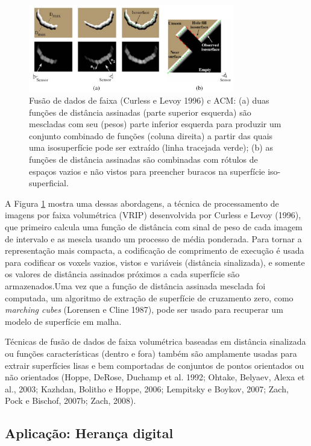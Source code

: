 \documentclass{article}
\begin{document}
\begin{figure}[!htb]
    \centering
    \includegraphics[width=0.8\textwidth]{fusaoDeDadosDeIntervalo.png}
    \caption{Fusão de dados de faixa (Curless e Levoy 1996) c ACM: (a) duas funções de distância assinadas (parte superior esquerda) são mescladas com seu (pesos) parte inferior esquerda para produzir um conjunto combinado de funções (coluna direita) a partir das quais uma isosuperfície pode ser extraído (linha tracejada verde); (b) as funções de distância assinadas são combinadas com rótulos de espaços vazios e não vistos para preencher buracos na superfície iso-superficial.}
    \label{fig:fusaoDeDadosDeIntervalo}
\end{figure}

A Figura \ref{fig:fusaoDeDadosDeIntervalo} mostra uma dessas abordagens, a técnica de processamento de imagens por faixa volumétrica (VRIP) desenvolvida por Curless e Levoy (1996), que primeiro calcula uma função de distância com sinal de peso de cada imagem de intervalo e as mescla usando um processo de média ponderada. Para tornar a representação mais compacta, a codificação de comprimento de execução é usada para codificar os voxels vazios, vistos e variáveis (distância sinalizada), e somente os valores de distância assinados próximos a cada superfície são armazenados.Uma vez que a função de distância assinada mesclada foi computada, um algoritmo de extração de superfície de cruzamento zero, como \textit{marching cubes} (Lorensen e Cline 1987), pode ser usado para recuperar um modelo de superfície em malha.

Técnicas de fusão de dados de faixa volumétrica baseadas em distância sinalizada ou funções características (dentro e fora) também são amplamente usadas para extrair superfícies lisas e bem comportadas de conjuntos de pontos orientados ou não orientados (Hoppe, DeRose, Duchamp et al. 1992; Ohtake, Belyaev, Alexa et al., 2003; Kazhdan, Bolitho e Hoppe, 2006; Lempitsky e Boykov, 2007; Zach, Pock e Bischof, 2007b; Zach, 2008).

\subsection{Aplicação: Herança digital}
\label{subSec:digitalHeritage}
\end{document}
